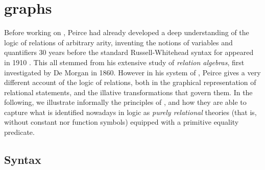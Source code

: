 \section{ graphs}

\begin{scope}

Before working on , Peirce had already developed a deep understanding of
the logic of relations of arbitrary arity, inventing the notions of variables
and quantifiers 30 years before the standard Russell-Whitehead syntax for
 appeared in 1910 \cite{sep-peirce}. This all stemmed from
his extensive study of \emph{relation algebras}, first investigated by De Morgan
in 1860. However in his system  of , Peirce gives a very
different account of the logic of relations, both in the graphical
representation of relational statements, and the illative transformations that
govern them. In the following, we illustrate informally the principles of
, and how they are able to capture what is identified nowadays in
 logic as \emph{purely relational}  theories (that
is, without constant nor function symbols) equipped with a primitive equality
predicate.

\subsection{Syntax}


\end{scope}
